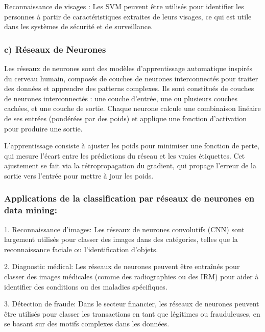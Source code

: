 \documentclass[a4paper,12pt]{report}
\begin{document}
        Reconnaissance de visages : Les SVM peuvent être utilisés pour identifier les personnes à partir de caractéristiques extraites de leurs visages, ce qui est utile dans les systèmes de sécurité et de surveillance.
        
        \subsubsection*{c) Réseaux de Neurones}
        Les réseaux de neurones sont des modèles d’apprentissage automatique inspirés du cerveau humain, composés de couches de neurones interconnectés pour traiter des données et apprendre des patterns complexes.
        Ils sont constitués de couches de neurones interconnectés : une couche d’entrée, une ou plusieurs couches cachées, et une couche de sortie. Chaque neurone calcule une combinaison linéaire de ses entrées (pondérées par des poids) et applique une fonction d’activation pour produire une sortie.

        L’apprentissage consiste à ajuster les poids pour minimiser une fonction de perte, qui mesure l’écart entre les prédictions du réseau et les vraies étiquettes. Cet ajustement se fait via la rétropropagation du gradient, qui propage l’erreur de la sortie vers l’entrée pour mettre à jour les poids.

        \subsubsection{Applications de la classification par réseaux de neurones en data mining:}

        1. Reconnaissance d'images: Les réseaux de neurones convolutifs (CNN) sont largement utilisés pour classer des images dans des catégories, telles que la reconnaissance faciale ou l'identification d'objets.
        
        2. Diagnostic médical: Les réseaux de neurones peuvent être entraînés pour classer des images médicales (comme des radiographies ou des IRM) pour aider à identifier des conditions ou des maladies spécifiques.
        
        3. Détection de fraude: Dans le secteur financier, les réseaux de neurones peuvent être utilisés pour classer les transactions en tant que légitimes ou frauduleuses, en se basant sur des motifs complexes dans les données.

        
\end{document}

